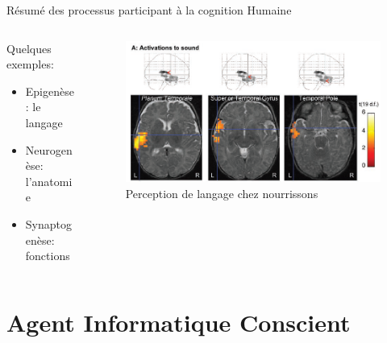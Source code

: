 \documentclass{beamer}
\begin{document}
\begin{frame}{Résumé des processus participant à la cognition Humaine}
\begin{columns}
\begin{column}{0.5\textwidth}
\begin{block}{}
Quelques exemples:
\begin{itemize}
    \item Epigenèse: le langage
    \item Neurogenèse: l'anatomie
    \item Synaptogenèse: fonctions
\end{itemize}
\end{block}
\end{column}
\begin{column}{0.4\textwidth}
\begin{block}{}
\begin{figure}
    \centering
    \includegraphics[width=\textwidth]{childLanguagePerception.png}
    \caption{Perception de langage chez nourrissons}
    \label{fig:percep}
\end{figure}
\end{block}
\end{column}
\end{columns}
\end{frame}

\section{Agent Informatique Conscient}
\end{document}
